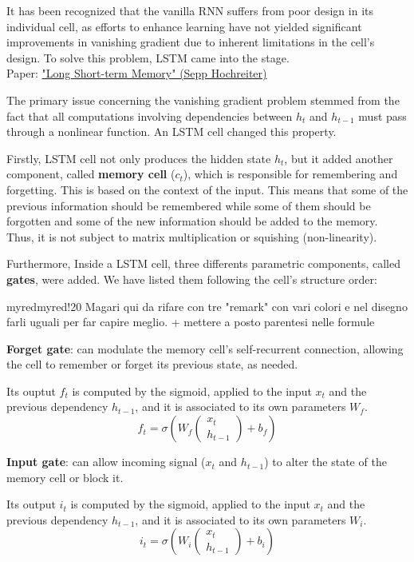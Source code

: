 It has been recognized that the vanilla RNN suffers from poor design in its individual cell, as efforts to enhance learning have not yielded significant improvements in vanishing gradient due to inherent limitations in the cell's design. To solve this problem, LSTM came into the stage. \\
Paper: \href{https://deeplearning.cs.cmu.edu/F23/document/readings/LSTM.pdf}{"Long Short-term Memory" (Sepp Hochreiter)}


The primary issue concerning the vanishing gradient problem stemmed from the fact that all computations involving dependencies between $h_t$ and $h_{t−1}$ must pass through a nonlinear function. An LSTM cell changed this property.

Firstly, LSTM cell not only produces the hidden state $h_t$, but it added another component, called \textbf{memory cell} ($c_t$), which is responsible for remembering and forgetting. This is based on the context of the input. This means that some of the previous information should be remembered while some of them should be forgotten and some of the new information should be added to the memory. Thus, it is not subject to matrix multiplication or squishing (non-linearity).

Furthermore, Inside a LSTM cell, three differents parametric components, called \textbf{gates}, were added. We have listed them following the cell's structure order:

\begin{remark}{myred}{myred!20}
Magari qui da rifare con tre "remark" con vari colori e nel disegno farli uguali per far capire meglio.
+ mettere a posto parentesi nelle formule
\end{remark}

\textbf{Forget gate}: can modulate the memory cell's self-recurrent
connection, allowing the cell to remember or forget its previous state, as needed.  

Its ouptut $f_t$ is computed by the sigmoid, applied to the input $x_t$ and the previous dependency $h_{t-1}$, and it is associated to its own parameters $W_f$. $$ f_t = \sigma(W_f
\begin{pmatrix}
x_t \\
h_{t-1}
\end{pmatrix} + b_f)
$$

    
\textbf{Input gate}: can allow incoming signal ($x_t$ and $h_{t-1}$) to alter the state of the memory cell or block it.

Its output $i_t$ is computed by the sigmoid, applied to the input $x_t$ and the previous dependency $h_{t-1}$, and it is associated to its own parameters $W_i$. $$ i_t = \sigma(W_i
\begin{pmatrix}
x_t \\
h_{t-1}
\end{pmatrix} + b_i)
$$

